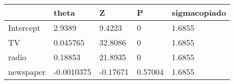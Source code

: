 \begin{tabular}{lllll}
& theta & Z & P & sigmacopiado \\ 
\hline 
Intercept & 2.9389 & 9.4223 & 0 & 1.6855 \\ 
TV & 0.045765 & 32.8086 & 0 & 1.6855 \\ 
radio & 0.18853 & 21.8935 & 0 & 1.6855 \\ 
newspaper & -0.0010375 & -0.17671 & 0.57004 & 1.6855 \\ 
\hline 
\end{tabular}